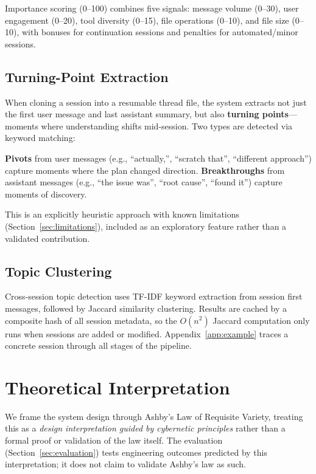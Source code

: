 \documentclass[11pt]{article}
\begin{document}
Importance scoring (0--100) combines five signals: message volume (0--30), user engagement (0--20), tool diversity (0--15), file operations (0--10), and file size (0--10), with bonuses for continuation sessions and penalties for automated/minor sessions.

\subsection{Turning-Point Extraction}

When cloning a session into a resumable thread file, the system extracts not just the first user message and last assistant summary, but also \textbf{turning points}---moments where understanding shifts mid-session. Two types are detected via keyword matching:

\textbf{Pivots} from user messages (e.g., ``actually,'', ``scratch that'', ``different approach'') capture moments where the plan changed direction. \textbf{Breakthroughs} from assistant messages (e.g., ``the issue was'', ``root cause'', ``found it'') capture moments of discovery.

This is an explicitly heuristic approach with known limitations (Section~\ref{sec:limitations}), included as an exploratory feature rather than a validated contribution.

\subsection{Topic Clustering}

Cross-session topic detection uses TF-IDF keyword extraction from session first messages, followed by Jaccard similarity clustering. Results are cached by a composite hash of all session metadata, so the $O(n^2)$ Jaccard computation only runs when sessions are added or modified. Appendix~\ref{app:example} traces a concrete session through all stages of the pipeline.

\section{Theoretical Interpretation}

We frame the system design through Ashby's Law of Requisite Variety, treating this as a \emph{design interpretation guided by cybernetic principles} rather than a formal proof or validation of the law itself. The evaluation (Section~\ref{sec:evaluation}) tests engineering outcomes predicted by this interpretation; it does not claim to validate Ashby's law as such.
\end{document}
